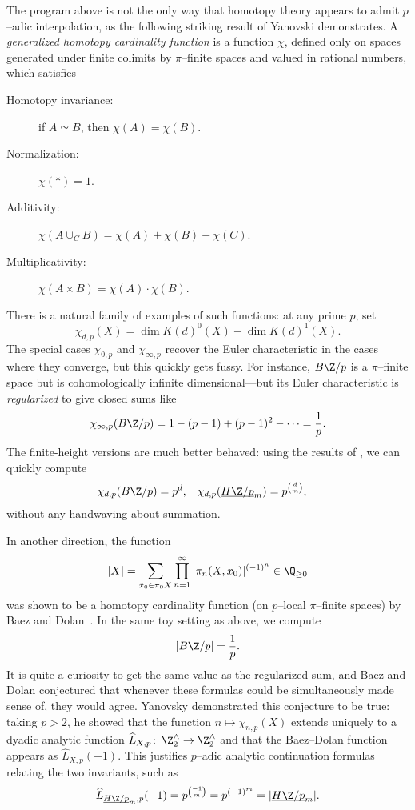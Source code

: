 The program above is not the only way that homotopy theory appears to admit \(p\)--adic interpolation, as the following striking result of Yanovski demonstrates.  A \textit{generalized homotopy cardinality function} is a function \(\chi\), defined only on spaces generated under finite colimits by \(\pi\)--finite spaces and valued in rational numbers, which satisfies
\begin{description}
    \item[Homotopy invariance:] if \(A \simeq B\), then \(\chi(A) = \chi(B)\).
    \item[Normalization:] \(\chi(*) = 1\).
    \item[Additivity:] \(\chi(A \cup_C B) = \chi(A) + \chi(B) - \chi(C)\).
    \item[Multiplicativity:] \(\chi(A \times B) = \chi(A) \cdot \chi(B)\).
\end{description}
There is a natural family of examples of such functions: at any prime \(p\), set \[\chi_{d,p}(X) = \dim K(d)^0(X) - \dim K(d)^1(X).\]  The special cases \(\chi_{0, p}\) and \(\chi_{\infty, p}\) recover the Euler characteristic in the cases where they converge, but this quickly gets fussy.  For instance, \(B\Z/p\) is a \(\pi\)--finite space but is cohomologically infinite dimensional---but its Euler characteristic is \textit{regularized} to give closed sums like \[\chi_{\infty, p}(B\Z/p) = 1 - (p-1) + (p-1)^2 - \cdots = \frac{1}{p}.\]  The finite-height versions are much better behaved: using the results of , we can quickly compute
\begin{align*}
\chi_{d,p}(B\Z/p) & = p^d, &
\chi_{d,p}(\OS{H\Z/p}{m}) & = p^{\binom{d}{m}},
\end{align*}
without any handwaving about summation.

In another direction, the function \[|X| = \sum_{x_0 \in \pi_0 X} \prod_{n=1}^\infty |\pi_n (X, x_0)|^{(-1)^n} \in \Q_{\ge 0}\] was shown to be a homotopy cardinality function (on \(p\)--local \(\pi\)--finite spaces) by Baez and Dolan~\cite{BaezDolan}.  In the same toy setting as above, we compute \[|B\Z/p| = \frac{1}{p}.\]  It is quite a curiosity to get the same value as the regularized sum, and Baez and Dolan conjectured that whenever these formulas could be simultaneously made sense of, they would agree.  Yanovsky demonstrated this conjecture to be true: taking \(p > 2\), he showed that the function \(n \mapsto \chi_{n, p}(X)\) extends uniquely to a dyadic analytic function \(\widehat L_{X,p}\co \Z^\wedge_2 \to \Z^\wedge_2\) and that the Baez--Dolan function appears as \(\widehat L_{X,p}(-1)\).  This justifies \(p\)--adic analytic continuation formulas relating the two invariants, such as \[\widehat L_{\OS{H\Z/p}{m}, p}(-1) = p^{\binom{-1}{m}} = p^{(-1)^m} = |\OS{H\Z/p}{m}|.\]







